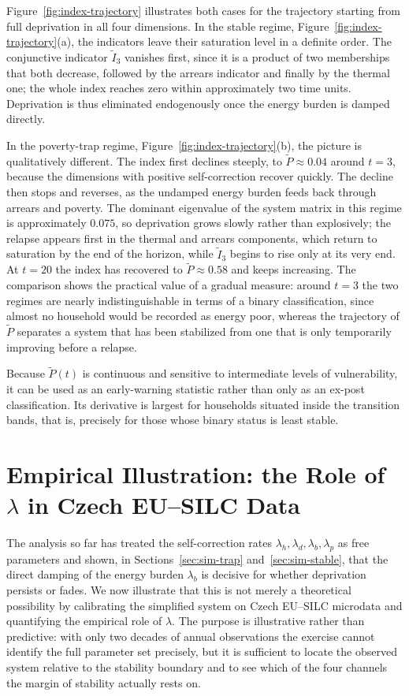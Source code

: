 \documentclass[11pt,a4paper]{article}
\begin{document}
Figure~\ref{fig:index-trajectory} illustrates both cases for the trajectory starting from full deprivation in all four dimensions. In the stable regime, Figure~\ref{fig:index-trajectory}(a), the indicators leave their saturation level in a definite order. The conjunctive indicator $\tilde I_3$ vanishes first, since it is a product of two memberships that both decrease, followed by the arrears indicator and finally by the thermal one; the whole index reaches zero within approximately two time units. Deprivation is thus eliminated endogenously once the energy burden is damped directly.

In the poverty-trap regime, Figure~\ref{fig:index-trajectory}(b), the picture is qualitatively different. The index first declines steeply, to $\tilde P\approx0.04$ around $t=3$, because the dimensions with positive self-correction recover quickly. The decline then stops and reverses, as the undamped energy burden feeds back through arrears and poverty. The dominant eigenvalue of the system matrix in this regime is approximately $0.075$, so deprivation grows slowly rather than explosively; the relapse appears first in the thermal and arrears components, which return to saturation by the end of the horizon, while $\tilde I_3$ begins to rise only at its very end. At $t=20$ the index has recovered to $\tilde P\approx0.58$ and keeps increasing. The comparison shows the practical value of a gradual measure: around $t=3$ the two regimes are nearly indistinguishable in terms of a binary classification, since almost no household would be recorded as energy poor, whereas the trajectory of $\tilde P$ separates a system that has been stabilized from one that is only temporarily improving before a relapse.

Because $\tilde P(t)$ is continuous and sensitive to intermediate levels of vulnerability, it can be used as an early-warning statistic rather than only as an ex-post classification. Its derivative is largest for households situated inside the transition bands, that is, precisely for those whose binary status is least stable.


\section{Empirical Illustration: the Role of $\lambda$ in Czech EU--SILC Data}
\label{sec:empirical-lambda}

The analysis so far has treated the self-correction rates $\lambda_h,\lambda_d,\lambda_b,\lambda_p$ as free parameters and shown, in Sections~\ref{sec:sim-trap} and~\ref{sec:sim-stable}, that the direct damping of the energy burden $\lambda_b$ is decisive for whether deprivation persists or fades. We now illustrate that this is not merely a theoretical possibility by calibrating the simplified system on Czech EU--SILC microdata and quantifying the empirical role of $\lambda$. The purpose is illustrative rather than predictive: with only two decades of annual observations the exercise cannot identify the full parameter set precisely, but it is sufficient to locate the observed system relative to the stability boundary and to see which of the four channels the margin of stability actually rests on.
\end{document}
